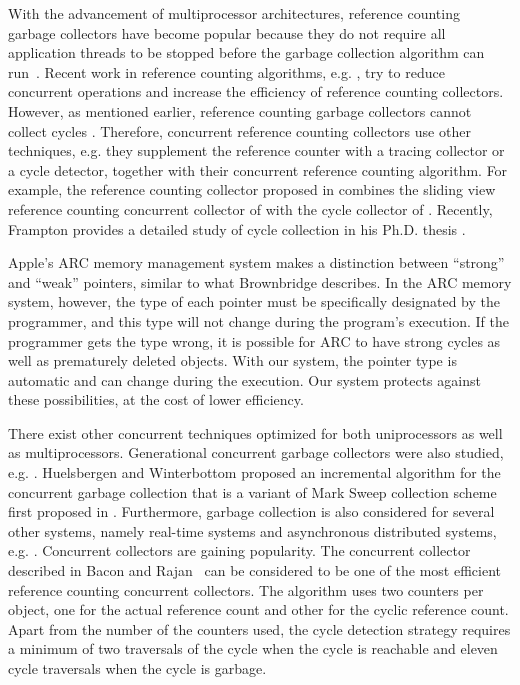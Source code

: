 With the advancement of multiprocessor architectures,
reference counting garbage collectors have become popular because
they do not require all application threads to be stopped before the garbage collection algorithm can run~\cite{Levanoni2006}.
Recent work in reference counting algorithms, e.g. \cite{Barabash2005,Levanoni2006,Bacon2001,Bacon:2001:JWC}, try to
reduce concurrent operations and increase the efficiency of reference counting collectors.
However, as mentioned earlier, reference counting garbage collectors cannot collect cycles \cite{McBeth1963}. Therefore, concurrent reference counting collectors \cite{Barabash2005,Levanoni2006,Bacon2001,Bacon:2001:JWC,Paz2007,Lins2008} use other techniques, e.g. they supplement the reference counter with a tracing collector or a cycle detector, together with their concurrent reference counting algorithm. For example, the reference counting collector proposed in \cite{Paz2007} combines the sliding view reference counting concurrent collector of \cite{Levanoni2006} with the cycle collector of \cite{Bacon2001}. Recently, Frampton provides a detailed study of cycle collection in his Ph.D. thesis \cite{Frampton2010}.


Apple's ARC memory management system makes a distinction between ``strong'' and ``weak'' pointers, similar to what Brownbridge describes. In the ARC memory system, however, the type of each pointer must be specifically designated by the programmer, and this type will not change during the program's execution. If the programmer gets the type wrong, it is possible for ARC to have strong cycles as well as prematurely deleted objects. With our system, the pointer type is automatic and can change during the execution. Our system protects against these possibilities, at the cost of lower efficiency.

There exist other concurrent techniques optimized for both uniprocessors as well as multiprocessors. Generational concurrent garbage collectors were also studied, e.g. \cite{Printezis:2000}. Huelsbergen and Winterbottom \cite{Huelsbergen1998} proposed an incremental algorithm for the concurrent garbage collection that is a variant of Mark Sweep collection scheme first proposed in \cite{McCarthy1960}.
Furthermore, garbage collection is also considered for several other systems, namely real-time systems %
and asynchronous distributed systems, e.g. \cite{Pizlo2008,Veiga2005}.
Concurrent collectors are gaining popularity. The concurrent collector described in Bacon and Rajan~\cite{Bacon2001} can be considered to be one of the most efficient reference counting concurrent collectors. The algorithm uses two counters per object, one for the actual reference count and other for the cyclic reference count. Apart from the number of the counters used, the cycle detection strategy requires a minimum of two traversals of the cycle when the cycle is reachable and eleven cycle traversals when the cycle is garbage.

